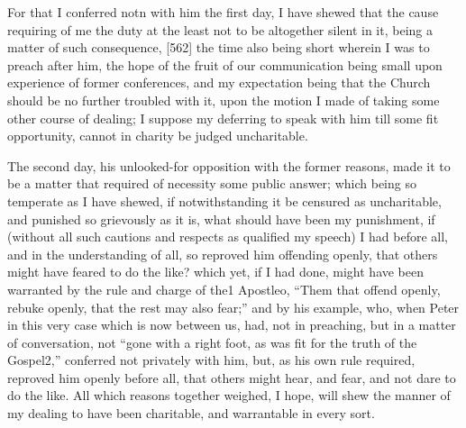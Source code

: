For that I conferred notn with him the first day, I have shewed that the cause requiring of me the duty at the least not to be altogether silent in it, being a matter of such consequence, [562] the time also being short wherein I was to preach after him, the hope of the fruit of our communication being small upon experience of former conferences, and my expectation being that the Church should be no further troubled with it, upon the motion I made of taking some other course of dealing; I suppose my deferring to speak with him till some fit opportunity, cannot in charity be judged uncharitable.

The second day, his unlooked-for opposition with the former reasons, made it to be a matter that required of necessity some public answer; which being so temperate as I have shewed, if notwithstanding it be censured as uncharitable, and punished so grievously as it is, what should have been my punishment, if (without all such cautions and respects as qualified my speech) I had before all, and in the understanding of all, so reproved him offending openly, that others might have feared to do the like? which yet, if I had done, might have been warranted by the rule and charge of the1 Apostleo, “Them that offend openly, rebuke openly, that the rest may also fear;” and by his example, who, when Peter in this very case which is now between us, had, not in preaching, but in a matter of conversation, not “gone with a right foot, as was fit for the truth of the Gospel2,” conferred not privately with him, but, as his own rule required, reproved him openly before all, that others might hear, and fear, and not dare to do the like. All which reasons together weighed, I hope, will shew the manner of my dealing to have been charitable, and warrantable in every sort.

